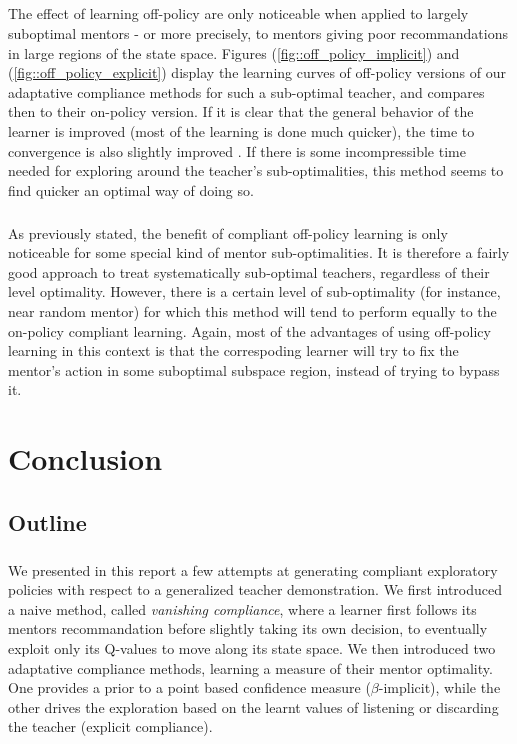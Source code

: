 \documentclass[a4paper]{report}
\begin{document}
{{{			\paragraph{} The effect of learning off-policy are only noticeable when applied to largely suboptimal mentors - or more precisely, to mentors giving poor recommandations in large regions of the state space. Figures (\ref{fig::off_policy_implicit}) and (\ref{fig::off_policy_explicit}) display the learning curves of off-policy versions of our adaptative compliance methods for such a sub-optimal teacher, and compares then to their on-policy version. If it is clear that the general behavior of the learner is improved (most of the learning is done much quicker), the time to convergence is also slightly improved . If there is some incompressible time needed for exploring around the teacher's sub-optimalities, this method seems to find quicker an optimal way of doing so. 
			
			\paragraph{} As previously stated, the benefit of compliant off-policy learning is only noticeable for some special kind of mentor sub-optimalities. It is therefore a fairly good approach to treat systematically sub-optimal teachers, regardless of their level optimality. However, there is a certain level of sub-optimality (for instance, near random mentor) for which this method will tend to perform equally to the on-policy compliant learning. Again, most of the advantages of using off-policy learning in this context is that the correspoding learner will try to fix the mentor's action in some suboptimal subspace region, instead of trying to bypass it. 
				
		}
	}
	
	\chapter{Conclusion}
	{
		\section{Outline}
		{
			\paragraph{} We presented in this report a few attempts at generating compliant exploratory policies with respect to a generalized teacher demonstration. We first introduced a naive method, called \emph{vanishing compliance}, where a learner first follows its mentors recommandation before slightly taking its own decision, to eventually exploit only its Q-values to move along its state space. We then introduced two adaptative compliance methods, learning a measure of their mentor optimality. One provides a prior to a point based confidence measure ($\beta$-implicit), while the other drives the exploration based on the learnt values of listening or discarding the teacher (explicit compliance).
			
}}}
\end{document}
